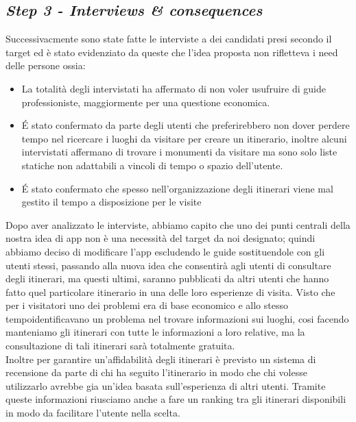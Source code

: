 \subsection{\emph{Step 3 - Interviews \& consequences}}
Successivacmente sono state fatte le interviste a dei candidati presi secondo il target ed è stato evidenziato da queste che l'idea proposta non rifletteva i need delle persone ossia:
\begin{itemize}
	\item La totalità degli intervistati ha affermato di non voler usufruire di guide professioniste, maggiormente per una questione economica.
	\item \'E stato confermato da parte degli utenti che preferirebbero non dover perdere tempo nel ricercare i luoghi da visitare per creare un itinerario, inoltre alcuni intervistati affermano di trovare i monumenti da visitare ma sono solo liste statiche non adattabili a vincoli di tempo o spazio dell'utente.
	\item \'E stato confermato che spesso nell'organizzazione degli itinerari viene mal gestito il tempo a disposizione per le visite
\end{itemize}
Dopo aver analizzato le interviste, abbiamo capito che uno dei punti centrali della nostra idea di app non è una necessità del target da noi designato; quindi abbiamo deciso di modificare l'app escludendo le guide sostituendole con gli utenti stessi, passando alla nuova idea che consentirà agli utenti di consultare degli itinerari, ma questi ultimi, saranno pubblicati da altri utenti che hanno fatto quel particolare itinerario in una delle loro esperienze di visita. Visto che per i visitatori uno dei problemi era di base economico e allo stesso tempoidentificavano un problema nel trovare informazioni sui luoghi, cosi facendo manteniamo gli itinerari con tutte le informazioni a loro relative, ma la consultazione di tali itinerari sarà totalmente gratuita.\\
Inoltre per garantire un'affidabilità degli itinerari è previsto un sistema di recensione da parte di chi ha seguito l'itinerario in modo che chi volesse utilizzarlo avrebbe gia un'idea basata sull'esperienza di altri utenti. Tramite queste informazioni riusciamo anche a fare un ranking tra gli itinerari disponibili in modo da facilitare l'utente nella scelta.\\



